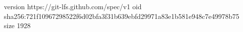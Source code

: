 version https://git-lfs.github.com/spec/v1
oid sha256:721f10967298522f6d02bfa3f31b639ebfd29971a83e1b581e948c7e49978b75
size 1928
